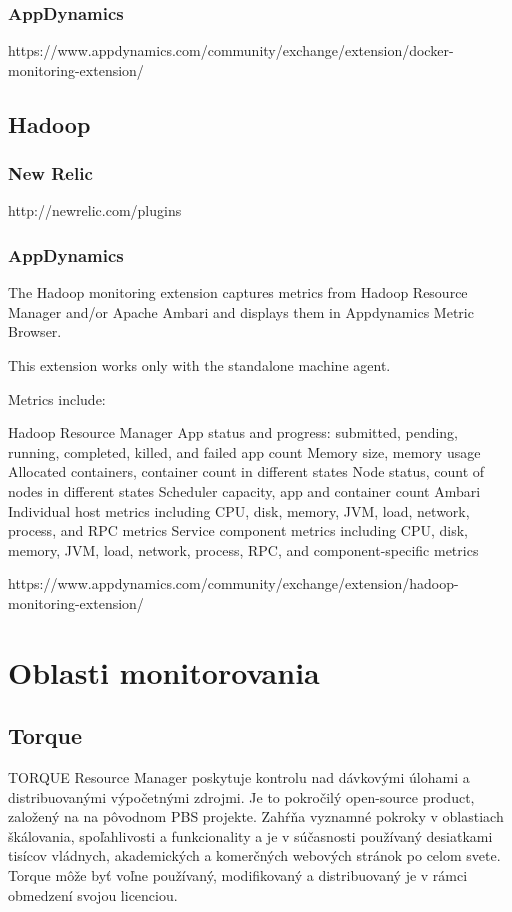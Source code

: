 \documentclass[11pt,final,oneside]{fithesis}
\begin{document}
\subsection{AppDynamics}
https://www.appdynamics.com/community/exchange/extension/docker-monitoring-extension/


\section{Hadoop}
\subsection{New Relic}
http://newrelic.com/plugins
\subsection{AppDynamics}
The Hadoop monitoring extension captures metrics from Hadoop Resource Manager and/or Apache Ambari and displays them in Appdynamics Metric Browser.

This extension works only with the standalone machine agent.


Metrics include:

Hadoop Resource Manager
App status and progress: submitted, pending, running, completed, killed, and failed app count
Memory size, memory usage
Allocated containers, container count in different states
Node status, count of nodes in different states
Scheduler capacity, app and container count
Ambari
Individual host metrics including CPU, disk, memory, JVM, load, network, process, and RPC metrics
Service component metrics including CPU, disk, memory, JVM, load, network, process, RPC, and component-specific metrics

https://www.appdynamics.com/community/exchange/extension/hadoop-monitoring-extension/

\chapter{Oblasti monitorovania}
\section{Torque}
TORQUE Resource Manager poskytuje kontrolu nad dávkovými úlohami a distribuovanými výpočetnými zdrojmi. Je to pokročilý open-source product, založený na na pôvodnom PBS projekte. 
Zahŕňa vyznamné pokroky v oblastiach škálovania, spoľahlivosti a funkcionality a je v súčasnosti používaný desiatkami tisícov vládnych, akademických a komerčných webových stránok po celom svete. Torque môže byť voľne používaný, modifikovaný a distribuovaný je v rámci obmedzení svojou licenciou.\cite{torque}
\end{document}

